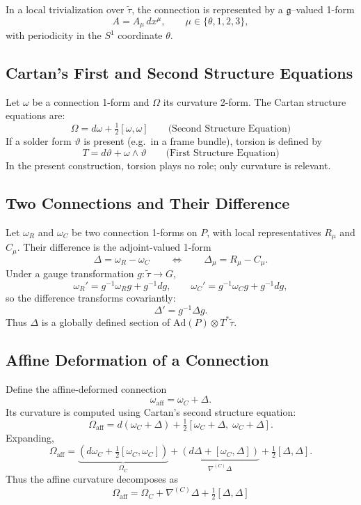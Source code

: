 \documentclass[12pt,openany]{book}
\theoremstyle{plain}
\theoremstyle{definition}
\theoremstyle{remark}
\begin{document}
In a local trivialization over $\tilde{\tau}$, the connection is represented
by a $\mathfrak{g}$--valued 1-form
\[
A = A_\mu\, dx^\mu,
\qquad
\mu \in \{\theta,1,2,3\},
\]
with periodicity in the $S^1$ coordinate $\theta$.

\subsection*{Cartan's First and Second Structure Equations}

Let $\omega$ be a connection 1-form and $\Omega$ its curvature 2-form. The
Cartan structure equations are:
\[
\boxed{
\Omega = d\omega + \tfrac{1}{2}[\omega,\omega]
}
\qquad\text{(Second Structure Equation)}
\]
If a solder form $\vartheta$ is present (e.g.\ in a frame bundle), torsion
is defined by
\[
\boxed{
T = d\vartheta + \omega \wedge \vartheta
}
\qquad\text{(First Structure Equation)}
\]
In the present construction, torsion plays no role; only curvature is
relevant.

\subsection*{Two Connections and Their Difference}

Let $\omega_R$ and $\omega_C$ be two connection 1-forms on $P$, with local
representatives $R_\mu$ and $C_\mu$. Their difference is the adjoint-valued
1-form
\[
\Delta = \omega_R - \omega_C
\qquad\Longleftrightarrow\qquad
\Delta_\mu = R_\mu - C_\mu.
\]
Under a gauge transformation $g : \tilde{\tau} \to G$,
\[
\omega_R' = g^{-1}\omega_R g + g^{-1}dg,
\qquad
\omega_C' = g^{-1}\omega_C g + g^{-1}dg,
\]
so the difference transforms covariantly:
\[
\Delta' = g^{-1}\Delta g.
\]
Thus $\Delta$ is a globally defined section of
$\mathrm{Ad}(P) \otimes T^*\tilde{\tau}$.

\subsection*{Affine Deformation of a Connection}

Define the affine-deformed connection
\[
\omega_{\mathrm{aff}} = \omega_C + \Delta.
\]
Its curvature is computed using Cartan's second structure equation:
\[
\Omega_{\mathrm{aff}}
= d(\omega_C + \Delta)
+ \tfrac{1}{2}[\omega_C + \Delta,\; \omega_C + \Delta].
\]
Expanding,
\[
\Omega_{\mathrm{aff}}
= \underbrace{(d\omega_C + \tfrac{1}{2}[\omega_C,\omega_C])}_{\Omega_C}
+ \underbrace{(d\Delta + [\omega_C,\Delta])}_{\nabla^{(C)}\Delta}
+ \tfrac{1}{2}[\Delta,\Delta].
\]
Thus the affine curvature decomposes as
\[
\boxed{
\Omega_{\mathrm{aff}}
= \Omega_C
+ \nabla^{(C)}\Delta
+ \tfrac{1}{2}[\Delta,\Delta]
}
\]
\end{document}
